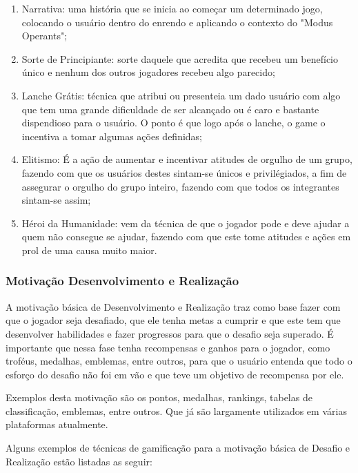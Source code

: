 \begin{enumerate}
    \item Narrativa: uma história que se inicia ao começar um determinado
        jogo, colocando o usuário dentro do enrendo e aplicando o contexto
        do "Modus Operants";
    \item Sorte de Principiante: sorte daquele que acredita que recebeu
        um benefício único e nenhum dos outros jogadores recebeu algo
        parecido;
    \item Lanche Grátis: técnica que atribui ou presenteia um dado usuário
        com algo que tem uma grande dificuldade de ser alcançado ou é
        caro e bastante dispendioso para o usuário.
        O ponto é que logo após o lanche, o game o incentiva a tomar
        algumas ações definidas;
    \item Elitismo: É a ação de aumentar e incentivar atitudes de orgulho
        de um grupo, fazendo com que os usuários destes sintam-se
        únicos e privilégiados, a fim de assegurar o orgulho do
        grupo inteiro, fazendo com que todos os integrantes sintam-se assim;
    \item Héroi da Humanidade: vem da técnica de que o jogador pode e deve
        ajudar a quem não consegue se ajudar, fazendo com que este tome
        atitudes e ações em prol de uma causa muito maior.
\end{enumerate}

\subsubsection{Motivação Desenvolvimento e Realização}
\label{sub:desenvolvimentoerealizacao}
A motivação básica de Desenvolvimento e Realização traz como base fazer
com que o jogador seja desafiado, que ele tenha metas a cumprir e que este
tem que desenvolver habilidades e fazer progressos para que o desafio
seja superado. É importante que nessa fase tenha recompensas e ganhos para
o jogador, como troféus, medalhas, emblemas, entre outros, para que o
usuário entenda que todo o esforço do desafio não foi em vão e que
teve um objetivo de recompensa por ele.

Exemplos desta motivação são os pontos, medalhas, rankings, tabelas de
classificação, emblemas, entre outros. Que já são largamente utilizados
em várias plataformas atualmente.

Alguns exemplos de técnicas de gamificação para a motivação básica
de Desafio e Realização estão listadas as seguir:


